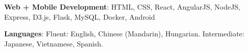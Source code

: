 






\textbf{Web + Mobile Development}: HTML, CSS, React, AngularJS, NodeJS, Express, D3.js, Flask, MySQL, Docker, Android %


\textbf{Languages}: Fluent: English, Chinese (Mandarin), Hungarian. Intermediate: Japanese, Vietnamese, Spanish. %


